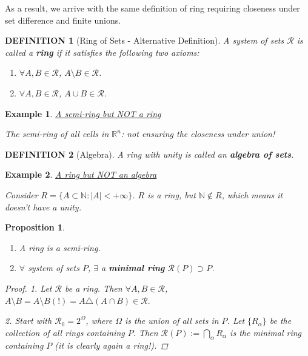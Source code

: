 \documentclass[12pt]{article}
\theoremstyle{blueplain}
\newtheorem{proposition}[theorem]{Proposition}
\theoremstyle{bluedef}
\newtheorem{definition}{DEFINITION}[section]
\theoremstyle{blueremark}
\newtheorem{example}{Example}[section]
\newcommand{\R}{\mathbb{R}}
\newcommand{\N}{\mathbb{N}}
\numberwithin{equation}{section}
\begin{document}
As a result, we arrive with the same definition of ring requiring closeness under set difference and finite unions.

\begin{definition}[Ring of Sets - Alternative Definition]

  A system of sets $\mathcal{R}$ is called a \textbf{ring} if it satisfies the following two axioms:
  \begin{enumerate}
    \item $\forall A, B \in \mathcal{R}$, $A \setminus B \in \mathcal{R}$.
    \item $\forall A, B \in \mathcal{R}$, $A \cup B \in \mathcal{R}$.
  \end{enumerate}
\end{definition}

\begin{example}\underline{A semi-ring but NOT a ring}

  The semi-ring of all cells in $\R^n$: not ensuring the closeness under union!
\end{example}

\begin{definition}[Algebra]

  A ring with unity is called an \textbf{algebra of sets}.
\end{definition}

\begin{example}\underline{A ring but NOT an algebra}

  Consider $R = \{ A \subset \N : |A| < +\infty \}$.
  $R$ is a ring, but $\N \notin R$, which means it doesn't have a unity.
\end{example}

\begin{proposition}
  \begin{enumerate}
    \item A ring is a semi-ring.
    \item $\forall$ system of sets $P$, $\exists$ a \textbf{minimal ring} $\mathcal{R}(P) \supset P$.
  \end{enumerate}
  \begin{proof}
    1. Let $\mathcal{R}$ be a ring. Then $\forall A, B \in \mathcal{R}$, $A \setminus B = A \setminus B (!)= A \triangle (A \cap B) \in \mathcal{R}.$

    2. Start with $\mathcal{R}_0 = 2^\Omega$, where $\Omega$ is the union of all sets in $P$. Let $\{R_\alpha\}$ be the collection of all rings containing $P$. Then
    \( \mathcal{R}(P) := \bigcap_\alpha R_\alpha \) is the minimal ring containing $P$ (it is clearly again a ring!).
  \end{proof}
\end{proposition}
\end{document}
